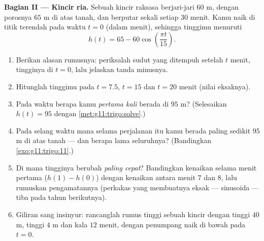 \begin{problem}
\medskip
\noindent\textbf{Bagian II --- Kincir ria.}
Sebuah kincir raksasa berjari-jari $60$ m, dengan porosnya $65$ m di atas
tanah, dan berputar sekali setiap $30$ menit. Kamu naik di
titik terendah pada waktu $t = 0$ (dalam menit), sehingga tinggimu menuruti
\[
h(t) = 65 - 60 \cos\!\left(\frac{\pi t}{15}\right).
\]
\begin{enumerate}[resume]
  \item Berikan alasan rumusnya: periksalah sudut yang ditempuh setelah $t$
        menit, tingginya di $t = 0$, lalu jelaskan tanda minusnya.
  \item Hitunglah tinggimu pada $t = 7.5$, $t = 15$ dan
        $t = 20$ menit (nilai eksaknya).
  \item Pada waktu berapa kamu \emph{pertama kali} berada di $95$ m?
        (Selesaikan $h(t) = 95$ dengan \cref{met:g11:trigo:solve}.)
  \item Pada selang waktu mana selama perjalanan itu kamu berada paling
        sedikit $95$ m di atas tanah --- dan berapa lama seluruhnya?
        (Bandingkan \cref{exo:g11:trigo:11}.)
  \item Di mana tingginya berubah \emph{paling cepat}? Bandingkan
        kenaikan selama menit pertama
        ($h(1) - h(0)$) dengan kenaikan antara menit $7$ dan
        $8$, lalu rumuskan pengamatannya (perkakas yang membuatnya
        eksak ---  sinusoida --- tiba
        pada tahun berikutnya).
  \item Giliran sang insinyur: rancanglah rumus tinggi sebuah kincir
        dengan tinggi  $40$ m, tinggi  $4$ m dan
        kala $12$ menit, dengan penumpang naik di bawah pada
        $t = 0$.
\end{enumerate}


\end{problem}

